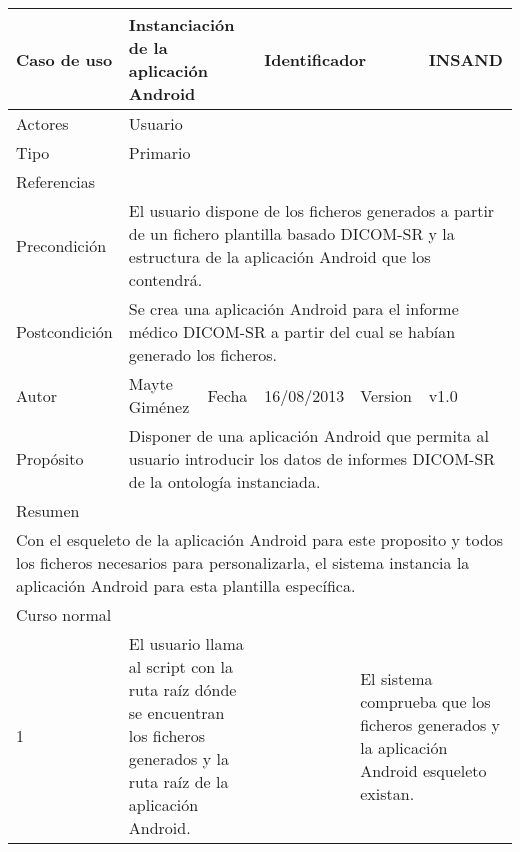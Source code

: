 \begin{center}
  \begin{longtable}{ |b{2.5cm}|b{4cm}|b{1cm}|b{2cm}|b{1.5cm}| b{2.5cm}| }
    \hline
    \cellcolor{RubineRed} {\color{White} Caso de uso} & \multicolumn{2}{|l|}{\parbox{4.5cm}{Instanciación de la aplicación Android}}  & \multicolumn{2}{|l|}{\color{RubineRed} Identificador}  &  INSAND \\ 
    \hline \hline
    {\color{RubineRed} Actores } & \multicolumn{5}{|l|}{Usuario}  \\ 
    \hline
    {\color{RubineRed} Tipo } & \multicolumn{5}{|l|}{Primario}  \\ 
    \hline
    {\color{RubineRed} Referencias } & \multicolumn{5}{|l|}{}  \\ 
    \hline
    {\color{RubineRed} Precondición } & \multicolumn{5}{|l|}{\parbox{13cm}{El usuario dispone de los ficheros generados a partir de un fichero plantilla basado DICOM-SR y la estructura de la aplicación Android que los contendrá.} }  \\ 
    \hline
    {\color{RubineRed} Postcondición } & \multicolumn{5}{|l|}{\parbox{13cm}{Se crea una aplicación Android para el informe médico DICOM-SR a partir del cual se habían generado los ficheros.}}  \\ 
    \hline
    {\color{RubineRed} Autor } &  Mayte Giménez & {\color{RubineRed} Fecha } & 16/08/2013 & {\color{RubineRed} Version } & v1.0 \\ 
    \hline
    {\color{RubineRed} Propósito } & \multicolumn{5}{|l|}{\parbox{13cm}{Disponer de una aplicación Android que permita al usuario introducir los datos de informes DICOM-SR de la ontología instanciada.}}  \\ 
    \hline
    \multicolumn{6}{|l|}{\parbox{8cm}{{\color{RubineRed} Resumen }}}  \\ 
    \hline
   	\multicolumn{6}{|l|}{\parbox{16cm}{ Con el esqueleto de la aplicación Android para este proposito y todos los ficheros necesarios para personalizarla, el sistema instancia la aplicación Android para esta plantilla específica.}}  \\ 
    \hline
    \multicolumn{6}{|l|}{\parbox{8cm}{{\color{RubineRed} Curso normal }}}  \\ 
    \hline
    1 & \multicolumn{2}{|l|}{\parbox{5cm}{El usuario llama al script con la ruta raíz dónde se encuentran los ficheros generados y la ruta raíz de la aplicación Android.}} &  & \multicolumn{2}{|l|}{\parbox{5cm}{ El sistema comprueba que los ficheros generados y la aplicación Android esqueleto existan.}}\\

\end{longtable}
\end{center}
